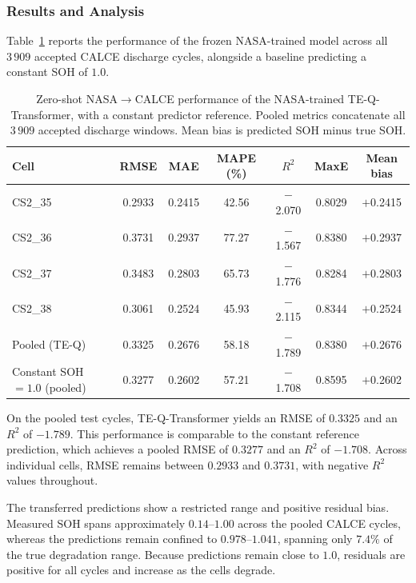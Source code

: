 \documentclass[a4paper,fleqn]{cas-sc}
\begin{document}
\subsubsection{Results and Analysis}\label{sec:calce_results}

Table~\ref{tab:calce} reports the performance of the frozen NASA-trained model across all $3\,909$ accepted CALCE discharge cycles, alongside a baseline predicting a constant SOH of $1.0$.

\begin{table}[t]
\centering
\small
\caption{Zero-shot NASA$\rightarrow$CALCE performance of the NASA-trained TE-Q-Transformer, with a constant predictor reference. Pooled metrics concatenate all $3\,909$ accepted discharge windows. Mean bias is predicted SOH minus true SOH.}\label{tab:calce}
\begin{tabular}{@{}lcccccc@{}}
\toprule
Cell & RMSE & MAE & MAPE (\%) & $R^2$ & MaxE & Mean bias \\
\midrule
CS2\_35 & 0.2933 & 0.2415 & 42.56 & $-$2.070 & 0.8029 & $+$0.2415 \\
CS2\_36 & 0.3731 & 0.2937 & 77.27 & $-$1.567 & 0.8380 & $+$0.2937 \\
CS2\_37 & 0.3483 & 0.2803 & 65.73 & $-$1.776 & 0.8284 & $+$0.2803 \\
CS2\_38 & 0.3061 & 0.2524 & 45.93 & $-$2.115 & 0.8344 & $+$0.2524 \\
\midrule
Pooled (TE-Q) & 0.3325 & 0.2676 & 58.18 & $-$1.789 & 0.8380 & $+$0.2676 \\
Constant SOH $=1.0$ (pooled) & 0.3277 & 0.2602 & 57.21 & $-$1.708 & 0.8595 & $+$0.2602 \\
\bottomrule
\end{tabular}
\end{table}

On the pooled test cycles, TE-Q-Transformer yields an RMSE of $0.3325$ and an $R^2$ of $-1.789$. This performance is comparable to the constant reference prediction, which achieves a pooled RMSE of $0.3277$ and an $R^2$ of $-1.708$. Across individual cells, RMSE remains between $0.2933$ and $0.3731$, with negative $R^2$ values throughout.

The transferred predictions show a restricted range and positive residual bias. Measured SOH spans approximately $0.14$--$1.00$ across the pooled CALCE cycles, whereas the predictions remain confined to $0.978$--$1.041$, spanning only $7.4\%$ of the true degradation range. Because predictions remain close to $1.0$, residuals are positive for all cycles and increase as the cells degrade.
\end{document}
